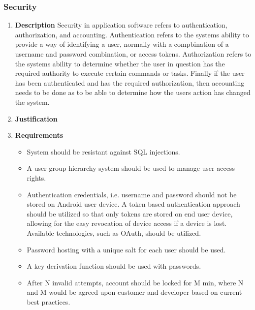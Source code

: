 \documentclass[a4paper,10pt]{article}
\begin{document}
\subsubsection{Security}
\begin{enumerate}
\item \textbf{Description}
Security in application software refers to authentication, authorization, and accounting. Authentication refers to the systems ability to provide a way of identifying a user, normally with a compbination of a username and password combination, or access tokens. Authorization refers to the systems ability to determine whether the user in question has the required authority to execute certain commands or tasks. Finally if the user has been authenticated and has the required authorization, then accounting needs to be done as to be able to determine how the users action has changed the system.  
\item \textbf{Justification}
\item \textbf{Requirements}
	\begin{itemize}
		\item System should be resistant against SQL injections.
		\item A user group hierarchy system should be used to manage user access rights.
		\item Authentication credentials, i.e. username and password should not be stored on Android user device. A token based authentication approach should be utilized so that only tokens are stored on end user device, allowing for the easy revocation of device access if a device is lost. Available technologies, such as OAuth, should be utilized.
		\item Password hosting with a unique salt for each user should be used.
		\item A key derivation function should be used with passwords. 
		\item After N invalid attempts, account should be locked for M min, where N and M would be agreed upon customer and developer based on current best practices.
	\end{itemize}
\end{enumerate}
\end{document}
